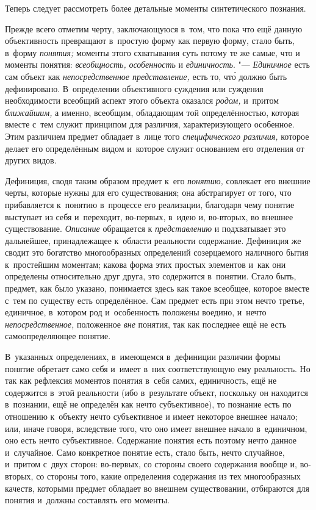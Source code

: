Теперь следует рассмотреть более детальные моменты синтетического познания.


Прежде всего отметим черту, заключающуюся в~том, что пока что
ещё данную объективность превращают в~простую форму как первую форму, стало
быть, в~форму {\em понятия;}
моменты этого схватывания суть потому те же самые, что и
моменты понятия: {\em всеобщность,}
{\em особенность} и
{\em единичность}. "---
{\em Единичное} есть сам
объект как {\em непосредственное
представление,} есть то, чт\'{о} должно быть дефинировано.
В~определении объективного суждения или суждения необходимости всеобщий
аспект этого объекта оказался
{\em родом,} и~притом
{\em ближайшим,} а
именно, всеобщим, обладающим той определённостью, которая вместе с~тем
служит принципом для различия, характеризующего особенное. Этим различием
предмет обладает в~лице того
{\em специфического различия,}
которое делает его определённым видом и~которое служит
основанием его отделения от других видов.

Дефиниция, сводя таким образом предмет к~его
{\em понятию,} совлекает
его внешние черты, которые нужны для его существования; она абстрагирует от
того, что прибавляется к~понятию в~процессе его реализации, благодаря чему
понятие выступает из себя и~переходит, во-первых, в~идею и, во-вторых, во
внешнее существование. {\em Описание}
обращается к
{\em представлению} и
подхватывает это дальнейшее, принадлежащее к~области реальности содержание.
Дефиниция же сводит это богатство многообразных определений созерцаемого
наличного бытия к~простейшим моментам; какова форма этих простых элементов
и~как они определены относительно друг друга, это содержится в~понятии.
Стало быть, предмет, как было указано, понимается здесь как такое всеобщее,
которое вместе с~тем по существу есть определённое. Сам предмет есть при
этом нечто третье, единичное, в~котором род и~особенность
положены воедино, и~нечто
{\em непосредственное,}
положенное {\em вне}
понятия, так как последнее ещё не есть самоопределяющее
понятие.

В~указанных определениях, в~имеющемся в~дефиниции различии
формы понятие обретает само себя и~имеет в~них соответствующую ему
реальность. Но так как рефлексия моментов понятия в~себя самих,
единичность, ещё не содержится в~этой реальности (ибо в~результате объект,
поскольку он находится в~познании, ещё не определён как нечто
субъективное), то познание есть по отношению к~объекту нечто субъективное и
имеет некоторое внешнее начало; или, иначе говоря, вследствие того, что оно
имеет внешнее начало в~единичном, оно есть нечто субъективное. Содержание
понятия есть поэтому нечто данное и~случайное. Само конкретное понятие
есть, стало быть, нечто случайное, и~притом с~двух сторон: во-первых, со
стороны своего содержания вообще и, во-вторых, со стороны того, какие
определения содержания из тех многообразных качеств, которыми предмет
обладает во внешнем существовании, отбираются для понятия и~должны
составлять его моменты.

